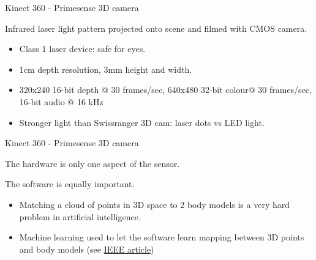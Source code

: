 \documentclass[compress]{beamer}
\begin{document}
\begin{frame}{Kinect 360 - Primesense 3D camera}

    Infrared laser light pattern projected onto scene and filmed with CMOS
    camera.

    \begin{itemize}

        \item
              Class 1 laser device: safe for eyes.
        \item
              1cm depth resolution, 3mm height and width.
        \item
              320x240 16-bit depth @ 30 frames/sec, 640x480 32-bit colour@ 30
              frames/sec, 16-bit audio @ 16 kHz
        \item
              Stronger light than Swissranger 3D cam: laser dots vs LED light.
    \end{itemize}

\end{frame}

\begin{frame}{Kinect 360 - Primesense 3D camera}

    The hardware is only one aspect of the sensor.

    The software is equally important.

    \begin{itemize}

        \item
              Matching a cloud of points in 3D space to 2 body models is a very hard
              problem in artificial intelligence.
        \item
              Machine learning used to let the software learn mapping between 3D
              points and body models (see
              \href{http://www.theinstitute.ieee.org/portal/site/tionline/menuitem.130a3558587d56e8fb2275875bac26c8/index.jsp?\&pName=institute_level1_article\&TheCat=2201\&article=tionline/legacy/inst2011/jan11/featuretech.xml\&}{IEEE
              article})
    \end{itemize}

\end{frame}
\end{document}
